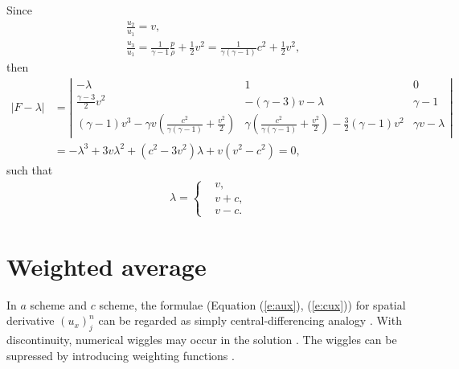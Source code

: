 \documentclass[11pt,dvips]{article}
\numberwithin{equation}{section}
\begin{document}
Since
\begin{align*}
  & \frac{u_2}{u_1} = v, \\
  & \frac{u_3}{u_1} = \frac{1}{\gamma-1}\frac{p}{\rho} + \frac{1}{2}v^2
    = \frac{1}{\gamma(\gamma-1)}c^2 + \frac{1}{2}v^2,
\end{align*}
then
\begin{align*}
  |F-\lambda| &=
    \left|\begin{array}{ccc}
      -\lambda & 1 & 0 \\
      \frac{\gamma-3}{2}v^2 &
      -(\gamma-3)v - \lambda &
      \gamma-1 \\
      (\gamma-1)v^3
        - \gamma v(\frac{c^2}{\gamma(\gamma-1)}+\frac{v^2}{2}) &
      \gamma(\frac{c^2}{\gamma(\gamma-1)}+\frac{v^2}{2})
        - \frac{3}{2}(\gamma-1)v^2 &
      \gamma v - \lambda
    \end{array}\right| \\
  &= -\lambda^3 + 3v\lambda^2 + (c^2-3v^2)\lambda + v(v^2-c^2)
   = 0,
\end{align*}
such that
\begin{align}
  \lambda =
  \left\{\begin{aligned}
    &v   , \\
    &v+c , \\
    &v-c .
  \end{aligned}\right. \label{e:euler_eigenvalue}
\end{align}

\section{Weighted average}
\label{s:weighted_average}

In $a$ scheme and $c$ scheme, the formulae (Equation (\ref{e:aux}),
(\ref{e:cux})) for spatial derivative $(u_x)_j^n$ can be regarded as simply
central-differencing analogy \citep{chang_method_1995,
chang_multi-dimensional_2003}.  With discontinuity, numerical wiggles may occur
in the solution \citep{chang_multi-dimensional_2003}.  The wiggles can be
supressed by introducing weighting functions \citep{chang_method_1995,
chang_multi-dimensional_2003}.
\end{document}
